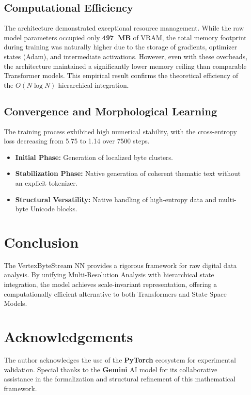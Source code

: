 \documentclass[11pt,a4paper]{article}
\begin{document}
\subsection{Computational Efficiency}
The architecture demonstrated exceptional resource management. While the raw model parameters occupied only \textbf{497~MB} of VRAM, the total memory footprint during training was naturally higher due to the storage of gradients, optimizer states (Adam), and intermediate activations. However, even with these overheads, the architecture maintained a significantly lower memory ceiling than comparable Transformer models. This empirical result confirms the theoretical efficiency of the $O(N \log N)$ hierarchical integration.

\subsection{Convergence and Morphological Learning}
The training process exhibited high numerical stability, with the cross-entropy loss decreasing from 5.75 to 1.14 over 7500 steps. 
\begin{itemize}
    \item \textbf{Initial Phase:} Generation of localized byte clusters.
    \item \textbf{Stabilization Phase:} Native generation of coherent thematic text without an explicit tokenizer.
    \item \textbf{Structural Versatility:} Native handling of high-entropy data and multi-byte Unicode blocks.
\end{itemize}

\section{Conclusion}
The VertexByteStream NN provides a rigorous framework for raw digital data analysis. By unifying Multi-Resolution Analysis with hierarchical state integration, the model achieves scale-invariant representation, offering a computationally efficient alternative to both Transformers and State Space Models.

\section*{Acknowledgements}
The author acknowledges the use of the \textbf{PyTorch} ecosystem for experimental validation. Special thanks to the \textbf{Gemini} AI model for its collaborative assistance in the formalization and structural refinement of this mathematical framework.
\end{document}
